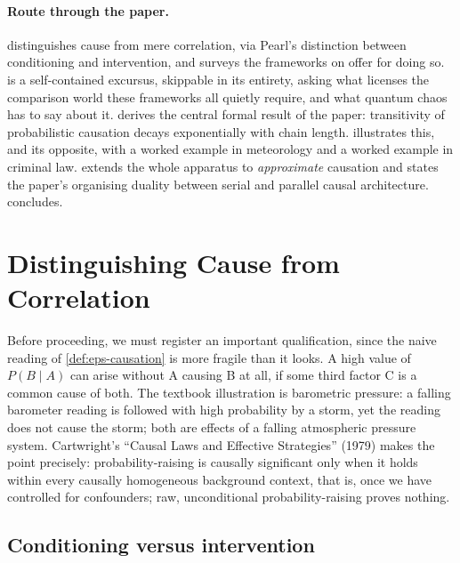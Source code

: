 \documentclass[11pt]{article}
\theoremstyle{definition}
\begin{document}
\paragraph{Route through the paper.}  distinguishes cause from mere correlation, via Pearl's distinction between conditioning and intervention, and surveys the frameworks on offer for doing so.  is a self-contained excursus, skippable in its entirety, asking what licenses the comparison world these frameworks all quietly require, and what quantum chaos has to say about it.  derives the central formal result of the paper: transitivity of probabilistic causation decays exponentially with chain length.  illustrates this, and its opposite, with a worked example in meteorology and a worked example in criminal law.  extends the whole apparatus to \emph{approximate} causation and states the paper's organising duality between serial and parallel causal architecture.  concludes.

\section{Distinguishing Cause from Correlation}
\label{sec:corr}

Before proceeding, we must register an important qualification, since the naive reading of \cref{def:eps-causation} is more fragile than it looks. A high value of $P(B \mid A)$ can arise without A causing B at all, if some third factor C is a common cause of both. The textbook illustration is barometric pressure: a falling barometer reading is followed with high probability by a storm, yet the reading does not cause the storm; both are effects of a falling atmospheric pressure system. Cartwright's ``Causal Laws and Effective Strategies'' (1979) makes the point precisely: probability-raising is causally significant only when it holds within every causally homogeneous background context, that is, once we have controlled for confounders; raw, unconditional probability-raising proves nothing.

\subsection{Conditioning versus intervention}
\end{document}
